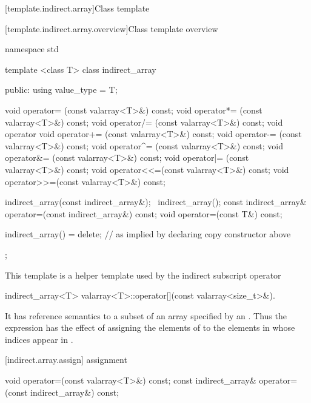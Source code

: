 [template.indirect.array]{Class template }

[template.indirect.array.overview]{Class template  overview}

%
\begin{codeblock}
namespace std {
  template <class T> class indirect_array {
  public:
    using value_type = T;

    void operator=  (const valarray<T>&) const;
    void operator*= (const valarray<T>&) const;
    void operator/= (const valarray<T>&) const;
    void operator%
    void operator+= (const valarray<T>&) const;
    void operator-= (const valarray<T>&) const;
    void operator^= (const valarray<T>&) const;
    void operator&= (const valarray<T>&) const;
    void operator|= (const valarray<T>&) const;
    void operator<<=(const valarray<T>&) const;
    void operator>>=(const valarray<T>&) const;

    indirect_array(const indirect_array&);
   ~indirect_array();
    const indirect_array& operator=(const indirect_array&) const;
    void operator=(const T&) const;

    indirect_array() = delete;        // as implied by declaring copy constructor above
  };
}
\end{codeblock}

\pnum
This template is a helper template used by the indirect subscript operator

%
%
\begin{itemdecl}
indirect_array<T> valarray<T>::operator[](const valarray<size_t>&).
\end{itemdecl}

\begin{itemdescr}
\pnum
It has reference semantics to a subset of an array specified by an
.
Thus the expression
has the effect of assigning the elements of
to the elements in
whose indices appear in
.
\end{itemdescr}

[indirect.array.assign]{ assignment}

%
\begin{itemdecl}
void operator=(const valarray<T>&) const;
const indirect_array& operator=(const indirect_array&) const;
\end{itemdecl}

